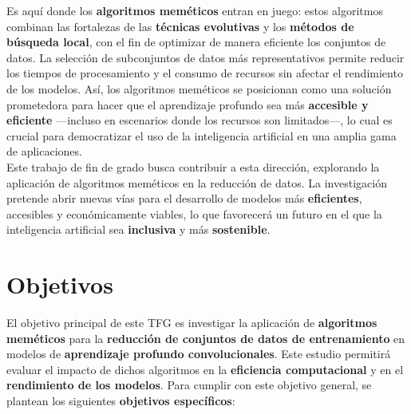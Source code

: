 Es aquí donde los \textbf{algoritmos meméticos} entran en juego: estos algoritmos combinan las fortalezas de las
\textbf{técnicas evolutivas} y los \textbf{métodos de búsqueda local}, con el fin de optimizar de manera eficiente los
conjuntos de datos.
La selección de subconjuntos de datos más representativos permite reducir los tiempos de procesamiento y el consumo de
recursos sin afectar el rendimiento de los modelos.
Así, los algoritmos meméticos se posicionan como una solución prometedora para hacer que el aprendizaje profundo sea
más \textbf{accesible y eficiente} —incluso en escenarios donde los recursos son limitados—, lo cual es crucial para
democratizar el uso de la inteligencia artificial en una amplia gama de aplicaciones. \\[6pt]

Este trabajo de fin de grado busca contribuir a esta dirección, explorando la aplicación de algoritmos meméticos
en la reducción de datos.
La investigación pretende abrir nuevas vías para el desarrollo de modelos más \textbf{eficientes}, accesibles y
económicamente viables, lo que favorecerá un futuro en el que la inteligencia artificial sea \textbf{inclusiva} y más
\textbf{sostenible}. \\[6pt]

\section{Objetivos}\label{sec:objetivos}
El objetivo principal de este TFG es investigar la aplicación de \textbf{algoritmos meméticos} para la
\textbf{reducción de conjuntos de datos de entrenamiento} en modelos de \textbf{aprendizaje profundo convolucionales}.
Este estudio permitirá evaluar el impacto de dichos algoritmos en la \textbf{eficiencia computacional} y en el
\textbf{rendimiento de los modelos}.
Para cumplir con este objetivo general, se plantean los siguientes \textbf{objetivos específicos}:

